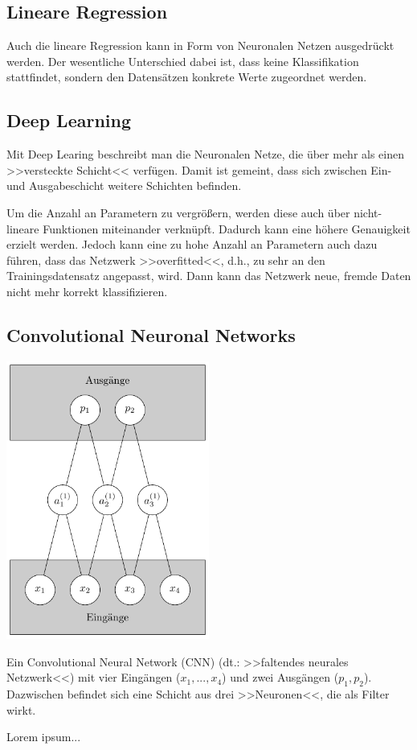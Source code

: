 \subsection{Lineare Regression}

Auch die lineare Regression kann in Form von Neuronalen Netzen ausgedrückt werden. Der wesentliche Unterschied dabei ist, dass keine Klassifikation stattfindet, sondern den Datensätzen konkrete Werte zugeordnet werden.


\subsection{Deep Learning}

Mit Deep Learing beschreibt man die Neuronalen Netze, die über mehr als einen >>versteckte Schicht<< verfügen. Damit ist gemeint, dass sich zwischen Ein- und Ausgabeschicht weitere Schichten befinden. 

Um die Anzahl an Parametern zu vergrößern, werden diese auch über nicht-lineare Funktionen miteinander verknüpft. Dadurch kann eine höhere Genauigkeit erzielt werden. Jedoch kann eine zu hohe Anzahl an Parametern auch dazu führen, dass das Netzwerk >>overfitted<<, d.h., zu sehr an den Trainingsdatensatz angepasst, wird. Dann kann das Netzwerk neue, fremde Daten nicht mehr korrekt klassifizieren.

\subsection{Convolutional Neuronal Networks}

\begin{dsafigure}
	\begin{center}
		\includegraphics[width=0.5\textwidth]{Figure_ConvNN}
		\caption{Ein Convolutional Neural Network (CNN) (dt.: >>faltendes neurales Netzwerk<<) mit vier Eingängen ($x_1, ..., x_4$) und zwei Ausgängen ($p_1, p_2$). Dazwischen befindet sich eine Schicht aus drei >>Neuronen<<, die als Filter wirkt.}
		\label{FigConvNN}
	\end{center}
\end{dsafigure}

Lorem ipsum...